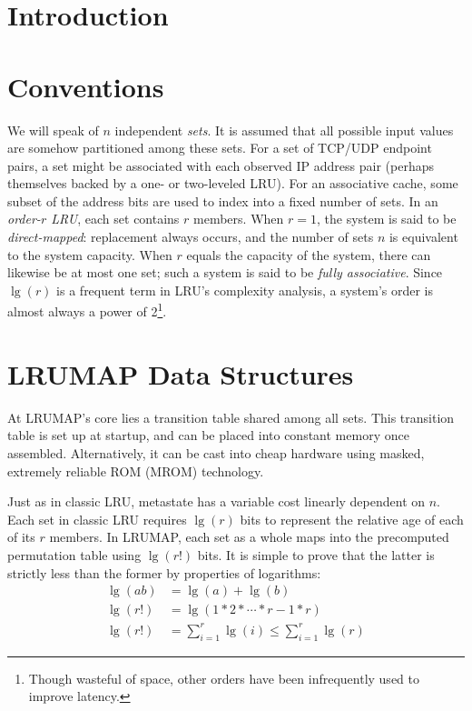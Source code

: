\documentclass[letterpaper,10pt]{article}
\begin{document}
\begin{multicols}{2}
\section{Introduction}
\cite{varghese}
\cite{xu}

\section{Conventions}
We will speak of $n$ independent \textit{sets}. It is assumed that all possible
input values are somehow partitioned among these sets. For a set of TCP/UDP
endpoint pairs, a set might be associated with each observed IP address pair
(perhaps themselves backed by a one- or two-leveled LRU). For an associative
cache, some subset of the address bits are used to index into a fixed number of
sets. In an \textit{order-$r$ LRU}, each set contains $r$ members. When $r=1$,
the system is said to be \textit{direct-mapped}: replacement always occurs, and
the number of sets $n$ is equivalent to the system capacity. When $r$ equals
the capacity of the system, there can likewise be at most one set; such a system
is said to be \textit{fully associative}. Since $\lg{(r)}$ is a frequent term in
LRU's complexity analysis, a system's order is almost always a power of 2\footnote{Though
wasteful of space, other orders have been infrequently used to improve latency\cite{intelcpuid}.}.
\section{LRUMAP Data Structures}
At LRUMAP's core lies a transition table shared among all sets. This transition
table is set up at startup, and can be placed into constant memory once
assembled. Alternatively, it can be cast into cheap hardware using masked,
extremely reliable ROM (MROM) technology\cite{ice}.

Just as in classic LRU, metastate has a variable cost linearly dependent on $n$.
Each set in classic LRU requires $\lg{(r)}$ bits to represent the relative age
of each of its $r$ members. In LRUMAP, each set as a whole maps into the
precomputed permutation table using $\lg{(r!)}$ bits. It is simple to prove that
the latter is strictly less than the former by properties of logarithms:
\begin{align*}
\lg{(ab)} &= \lg{(a)} + \lg{(b)} \\
\lg{(r!)} &= \lg{(1*2*\dotsb*r-1*r)} \\
\lg{(r!)} &= \sum_{i=1}^{r}{\lg{(i)}} \le \sum_{i=1}^{r}{\lg{(r)}}
\end{align*}

\end{multicols}
\end{document}
